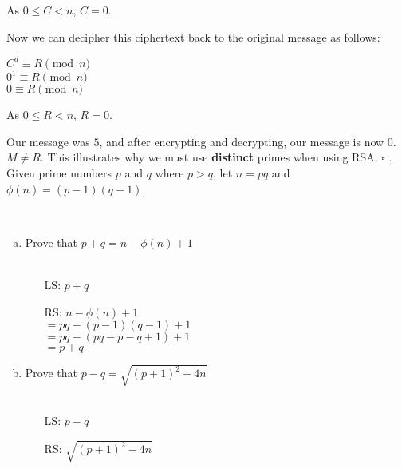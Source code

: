 \documentclass{letter}
\begin{document}
As $0 \leq C < n$, $C = 0$.

Now we can decipher this ciphertext back to the original message as follows:

$C^d \equiv R \pmod{n}$\\
$0^1 \equiv R \pmod{n}$\\
$0 \equiv R \pmod{n}$

As $0 \leq R < n$, $R = 0$.

Our message was $5$, and after encrypting and decrypting, our message is now $0$. $M \neq R$. This illustrates why we must use \textbf{distinct} primes when using RSA. $\square$
. Given prime numbers $p$ and $q$ where $p>q$, let $n=pq$ and $\phi(n) = (p-1)(q-1)$.

\hrulefill\\
\begin{enumerate}[(a)]
	\item Prove that $p + q = n - \phi(n) + 1$\\\\
	\begin{minipage}[t]{0.5\textwidth}
		\begin{itemize}
			\item[LS: ]$p+q$
		\end{itemize}
	\end{minipage}
	\begin{minipage}[t]{0.5\textwidth}
		\begin{itemize}
			\item[RS: ]$n - \phi(n) + 1$\\
			$= pq - (p-1)(q-1) + 1$\\
			$= pq - (pq - p - q + 1) + 1$\\
			$= p+q$\\
		\end{itemize}
	\end{minipage}
	\item Prove that $p - q = \sqrt{(p+1)^2 - 4n}$\\\\
	\begin{minipage}[t]{0.5\textwidth}
		\begin{itemize}
			\item[LS: ]$p-q$
		\end{itemize}
	\end{minipage}
	\begin{minipage}[t]{0.5\textwidth}
		\begin{itemize}
			\item[RS: ]$\sqrt{(p+1)^2 - 4n}$\\

\end{itemize}
\end{minipage}
\end{enumerate}
\end{document}
